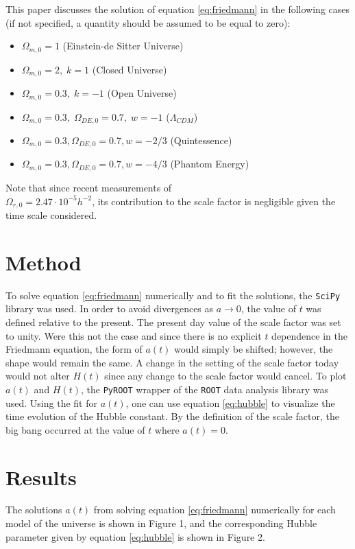 \documentclass[aps,reprint,prl,floatfix,nofootinbib]{revtex4-1}
\begin{document}
\newpage
This paper discusses the solution of equation \ref{eq:friedmann} in the following cases (if not specified, a quantity should be assumed to be equal to zero):
\begin{itemize}
\item $\Omega_{m,0}=1$ (Einstein-de Sitter Universe)
\item $\Omega_{m,0}=2,\;k=1$ (Closed Universe)
\item $\Omega_{m,0}=0.3,\;k=-1$ (Open Universe)
\item $\Omega_{m,0}=0.3,\;\Omega_{DE,0}=0.7,\;w=-1$ ($\Lambda_{CDM}$)
\item $\Omega_{m,0}=0.3,\Omega_{DE,0}=0.7,w=-2/3$ (Quintessence)
\item $\Omega_{m,0}=0.3,\Omega_{DE,0}=0.7,w=-4/3$ (Phantom Energy)
\end{itemize}
Note that since recent measurements \cite{pdg} of \\$\Omega_{r,0}=2.47\cdot10^{-5}h^{-2}$, its contribution to the scale factor is negligible given the time scale considered.
\section*{Method}
To solve equation \ref{eq:friedmann} numerically and to fit the solutions, the \texttt{SciPy} library \cite{scipy} was used.  In order to avoid divergences as $a\rightarrow0$, the value of $t$ was defined relative to the present.  The present day value of the scale factor was set to unity.  Were this not the case and since there is no explicit $t$ dependence in the Friedmann equation, the form of $a(t)$ would simply be shifted; however, the shape would remain the same.  A change in the setting of the scale factor today would not alter $H(t)$ since any change to the scale factor would cancel.  To plot $a(t)$ and $H(t)$, the \texttt{PyROOT} wrapper of the \texttt{ROOT} data analysis library \cite{ROOT} was used.  Using the fit for $a(t)$, one can use equation \ref{eq:hubble} to visualize the time evolution of the Hubble constant.  By the definition of the scale factor, the big bang occurred at the value of $t$ where $a(t) = 0$.
\section*{Results}
The solutions $a(t)$ from solving equation \ref{eq:friedmann} numerically for each model of the universe is shown in Figure 1, and the corresponding Hubble parameter given by equation \ref{eq:hubble} is shown in Figure 2.
\end{document}
